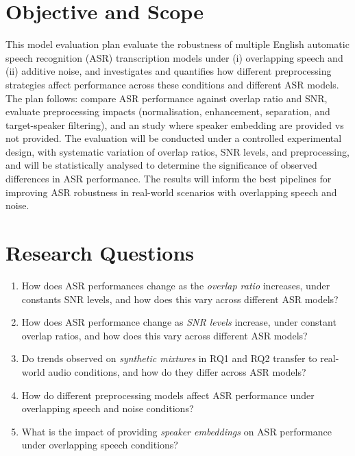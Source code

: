 \section{Objective and Scope}
This model evaluation plan evaluate the robustness of multiple English automatic speech recognition (ASR) transcription models under (i) overlapping speech and (ii) additive noise, and investigates and quantifies how different preprocessing strategies affect performance across these conditions and different ASR models. The plan follows: compare ASR performance against overlap ratio and SNR, evaluate preprocessing impacts (normalisation, enhancement, separation, and target-speaker filtering), and an study where speaker embedding are provided vs not provided. The evaluation will be conducted under a controlled experimental design, with systematic variation of overlap ratios, SNR levels, and preprocessing, and will be statistically analysed to determine the significance of observed differences in ASR performance. The results will inform the best pipelines for improving ASR robustness in real-world scenarios with overlapping speech and noise.

\section{Research Questions}
\begin{enumerate}[label=\textbf{RQ\arabic*:}, leftmargin=*]
    \item How does ASR performances change as the \emph{overlap ratio} increases, under constants SNR levels, and how does this vary across different ASR models?
    \item How does ASR performance change as \emph{SNR levels} increase, under constant overlap ratios, and how does this vary across different ASR models?
    \item Do trends observed on \emph{synthetic mixtures} in RQ1 and RQ2 transfer to real-world audio conditions, and how do they differ across ASR models?
    \item How do different preprocessing models affect ASR performance under overlapping speech and noise conditions?
    \item What is the impact of providing \emph{speaker embeddings} on ASR performance under overlapping speech conditions?
\end{enumerate}

